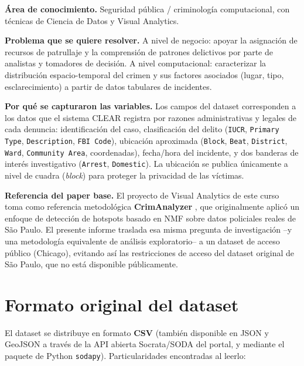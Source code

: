 \documentclass[11pt,a4paper]{article}
\begin{document}
\textbf{Área de conocimiento.} Seguridad pública / criminología
computacional, con técnicas de Ciencia de Datos y Visual Analytics.

\textbf{Problema que se quiere resolver.} A nivel de negocio: apoyar la
asignación de recursos de patrullaje y la comprensión de patrones
delictivos por parte de analistas y tomadores de decisión. A nivel
computacional: caracterizar la distribución espacio-temporal del crimen y
sus factores asociados (lugar, tipo, esclarecimiento) a partir de datos
tabulares de incidentes.

\textbf{Por qué se capturaron las variables.} Los campos del dataset
corresponden a los datos que el sistema CLEAR registra por razones
administrativas y legales de cada denuncia: identificación del caso,
clasificación del delito (\texttt{IUCR}, \texttt{Primary Type},
\texttt{Description}, \texttt{FBI Code}), ubicación aproximada
(\texttt{Block}, \texttt{Beat}, \texttt{District}, \texttt{Ward},
\texttt{Community Area}, coordenadas), fecha/hora del incidente, y dos
banderas de interés investigativo (\texttt{Arrest}, \texttt{Domestic}). La
ubicación se publica únicamente a nivel de cuadra (\textit{block}) para
proteger la privacidad de las víctimas.

\textbf{Referencia del paper base.} El proyecto de Visual Analytics de este
curso toma como referencia metodológica \textbf{CrimAnalyzer}
\cite{crimanalyzer}, que originalmente aplicó un enfoque de detección de
hotspots basado en NMF sobre datos policiales reales de São Paulo. El
presente informe traslada esa misma pregunta de investigación --y una
metodología equivalente de análisis exploratorio-- a un dataset de acceso
público (Chicago), evitando así las restricciones de acceso del dataset
original de São Paulo, que no está disponible públicamente.

\section{Formato original del dataset}

El dataset se distribuye en formato \textbf{CSV} (también disponible en
JSON y GeoJSON a través de la API abierta Socrata/SODA del portal, y
mediante el paquete de Python \texttt{sodapy}). Particularidades encontradas
al leerlo:
\end{document}
